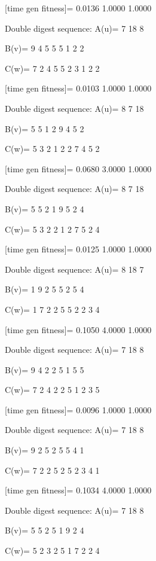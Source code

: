 [time gen fitness]=
    0.0136    1.0000    1.0000

Double digest sequence:
A(u)=
     7    18     8

B(v)=
     9     4     5     5     5     1     2     2

C(w)=
     7     2     4     5     5     2     3     1     2     2

[time gen fitness]=
    0.0103    1.0000    1.0000

Double digest sequence:
A(u)=
     8     7    18

B(v)=
     5     5     1     2     9     4     5     2

C(w)=
     5     3     2     1     2     2     7     4     5     2

[time gen fitness]=
    0.0680    3.0000    1.0000

Double digest sequence:
A(u)=
     8     7    18

B(v)=
     5     5     2     1     9     5     2     4

C(w)=
     5     3     2     2     1     2     7     5     2     4

[time gen fitness]=
    0.0125    1.0000    1.0000

Double digest sequence:
A(u)=
     8    18     7

B(v)=
     1     9     2     5     5     2     5     4

C(w)=
     1     7     2     2     5     5     2     2     3     4

[time gen fitness]=
    0.1050    4.0000    1.0000

Double digest sequence:
A(u)=
     7    18     8

B(v)=
     9     4     2     2     5     1     5     5

C(w)=
     7     2     4     2     2     5     1     2     3     5

[time gen fitness]=
    0.0096    1.0000    1.0000

Double digest sequence:
A(u)=
     7    18     8

B(v)=
     9     2     5     2     5     5     4     1

C(w)=
     7     2     2     5     2     5     2     3     4     1

[time gen fitness]=
    0.1034    4.0000    1.0000

Double digest sequence:
A(u)=
     7    18     8

B(v)=
     5     5     2     5     1     9     2     4

C(w)=
     5     2     3     2     5     1     7     2     2     4

